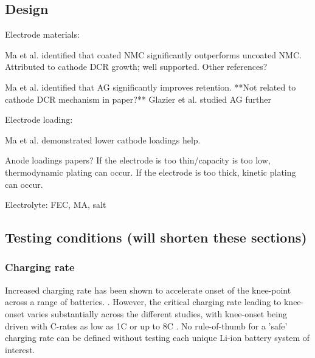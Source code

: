 \documentclass{article}
\begin{document}
\subsection{Design}

Electrode materials:

Ma et al.\cite{ma_editors_2019} identified that coated NMC significantly outperforms uncoated NMC.
Attributed to cathode DCR growth; well supported.
Other references?

Ma et al.\cite{ma_editors_2019} identified that AG significantly improves retention.
**Not related to cathode DCR mechanism in paper?**
Glazier et al. studied AG further


Electrode loading:

Ma et al.\cite{ma_editors_2019} demonstrated lower cathode loadings help.

Anode loadings papers?
If the electrode is too thin/capacity is too low, thermodynamic plating can occur.
If the electrode is too thick, kinetic plating can occur.


Electrolyte: FEC, MA, salt


\subsection{Testing conditions (will shorten these sections)}

\subsubsection{Charging rate}
Increased charging rate has been shown to accelerate onset of the knee-point across a range of batteries. \cite{lewerenz_systematic_2017,lewerenz_post-mortem_2017, petzl_lithium_2015, burns_-situ_2015, waldmann_optimization_2015, schuster_nonlinear_2015, severson_data-driven_2019, schindler_fast_2018, keil_linear_2019}. However, the critical charging rate leading to knee-onset varies substantially across the different studies, with knee-onset being driven with C-rates as low as 1C \cite{waldmann_optimization_2015} or up to 8C \cite{lewerenz_systematic_2017}. No rule-of-thumb for a 'safe' charging rate can be defined without testing each unique Li-ion battery system of interest.
\end{document}
